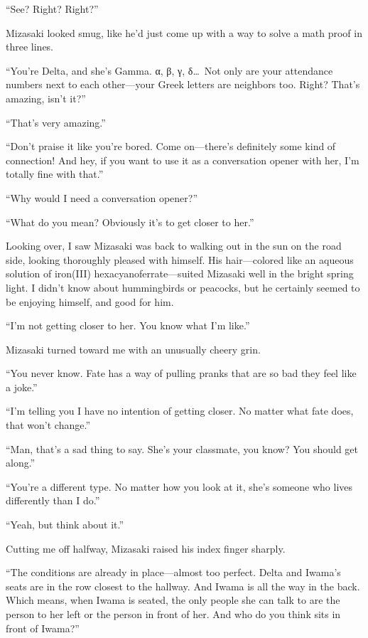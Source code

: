 \documentclass[
    a4paper,
    12pt,
    twoside,
    openany,
    UTF8,
    fontset=windows
]{ctexbook}
\begin{document}
``See? Right? Right?''

Mizasaki looked smug, like he'd just come up with a way to solve a math proof in three lines.

``You're Delta, and she's Gamma. α, β, γ, δ\dots\ Not only are your attendance numbers next to each other---your Greek letters are neighbors too. Right? That's amazing, isn't it?''

``That's very amazing.''

``Don't praise it like you're bored. Come on---there's definitely some kind of connection! And hey, if you want to use it as a conversation opener with her, I'm totally fine with that.''

``Why would I need a conversation opener?''

``What do you mean? Obviously it's to get closer to her.''

Looking over, I saw Mizasaki was back to walking out in the sun on the road side, looking thoroughly pleased with himself. His hair---colored like an aqueous solution of iron(III) hexacyanoferrate---suited Mizasaki well in the bright spring light. I didn't know about hummingbirds or peacocks, but he certainly seemed to be enjoying himself, and good for him.

``I'm not getting closer to her. You know what I'm like.''

Mizasaki turned toward me with an unusually cheery grin.

``You never know. Fate has a way of pulling pranks that are so bad they feel like a joke.''

``I'm telling you I have no intention of getting closer. No matter what fate does, that won't change.''

``Man, that's a sad thing to say. She's your classmate, you know? You should get along.''

``You're a different type. No matter how you look at it, she's someone who lives differently than I do.''

``Yeah, but think about it.''

Cutting me off halfway, Mizasaki raised his index finger sharply.

``The conditions are already in place---almost too perfect. Delta and Iwama's seats are in the row closest to the hallway. And Iwama is all the way in the back. Which means, when Iwama is seated, the only people she can talk to are the person to her left or the person in front of her. And who do you think sits in front of Iwama?''
\end{document}
